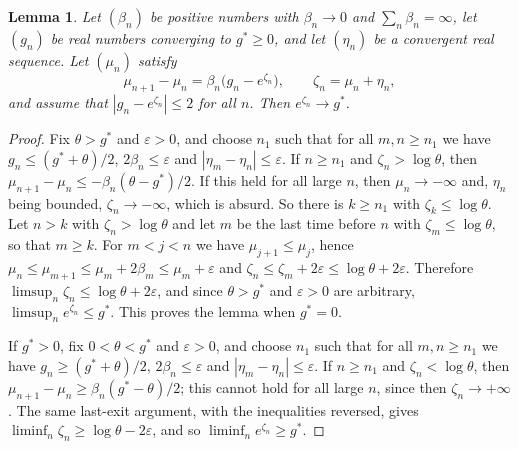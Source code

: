 \documentclass[11pt]{amsart}
\newtheorem{lemma}[theorem]{Lemma}
\theoremstyle{remark}
\begin{document}
\begin{lemma}\label{lem:det}
Let $(\beta_n)$ be positive numbers with $\beta_n\to0$ and $\sum_n\beta_n=\infty$, let $(g_n)$ be real numbers
converging to $g^*\ge0$, and let $(\eta_n)$ be a convergent real sequence. Let $(\mu_n)$ satisfy
\[
\mu_{n+1}-\mu_n=\beta_n\bigl(g_n-e^{\zeta_n}\bigr),\qquad \zeta_n=\mu_n+\eta_n,
\]
and assume that $|g_n-e^{\zeta_n}|\le2$ for all $n$. Then $e^{\zeta_n}\to g^*$.
\end{lemma}
\begin{proof}
Fix $\theta>g^*$ and $\varepsilon>0$, and choose $n_1$ such that for all $m,n\ge n_1$ we have $g_n\le(g^*+\theta)/2$,
$2\beta_n\le\varepsilon$ and $|\eta_m-\eta_n|\le\varepsilon$. If $n\ge n_1$ and $\zeta_n>\log\theta$, then
$\mu_{n+1}-\mu_n\le-\beta_n(\theta-g^*)/2$. If this held for all large $n$, then $\mu_n\to-\infty$ and, $\eta_n$ being
bounded, $\zeta_n\to-\infty$, which is absurd. So there is $k\ge n_1$ with $\zeta_k\le\log\theta$. Let $n>k$ with
$\zeta_n>\log\theta$ and let $m$ be the last time before $n$ with $\zeta_m\le\log\theta$, so that $m\ge k$. For $m<j<n$ we
have $\mu_{j+1}\le \mu_j$, hence $\mu_n\le \mu_{m+1}\le \mu_m+2\beta_m\le \mu_m+\varepsilon$ and
$\zeta_n\le \zeta_m+2\varepsilon\le\log\theta+2\varepsilon$. Therefore $\limsup_n\zeta_n\le\log\theta+2\varepsilon$, and since
$\theta>g^*$ and $\varepsilon>0$ are arbitrary, $\limsup_ne^{\zeta_n}\le g^*$. This proves the lemma when $g^*=0$.

If $g^*>0$, fix $0<\theta<g^*$ and $\varepsilon>0$, and choose $n_1$ such that for all $m,n\ge n_1$ we have
$g_n\ge(g^*+\theta)/2$, $2\beta_n\le\varepsilon$ and $|\eta_m-\eta_n|\le\varepsilon$. If $n\ge n_1$ and
$\zeta_n<\log\theta$, then $\mu_{n+1}-\mu_n\ge\beta_n(g^*-\theta)/2$; this cannot hold for all large $n$, since then
$\zeta_n\to+\infty$. The same last-exit argument, with the inequalities reversed, gives
$\liminf_n\zeta_n\ge\log\theta-2\varepsilon$, and so $\liminf_ne^{\zeta_n}\ge g^*$.
\end{proof}
\end{document}

